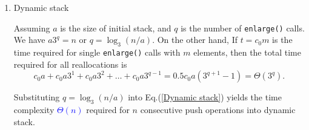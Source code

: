 \documentclass[12pt]{article}
\begin{document}
\begin{enumerate}
\item Dynamic stack\par

Assuming $a$ is the size of initial stack, and $q$ is the number of \texttt{enlarge()} calls.
We have $a3^{q}=n$ or $q=\log_{3}(n/a)$. On the other hand, If $t=c_{0}m$ is the time required for single \texttt{enlarge()} calls with $m$ elements, then the total time required for all reallocations is
\begin{equation}
c_{0}a+c_{0}a3^1+c_{0}a3^2+\dots+c_{0}a3^{q-1}=0.5c_{0}a\left(3^{q+1}-1\right)=\Theta(3^{q}).
\label{Dynamic stack}
\end{equation}

Substituting $q=\log_{3}(n/a)$ into Eq.(\ref{Dynamic stack}) yields the time complexity \textcolor{blue}{$\Theta(n)$} required for $n$ consecutive push operations into dynamic stack.
\end{enumerate}
\end{document}

